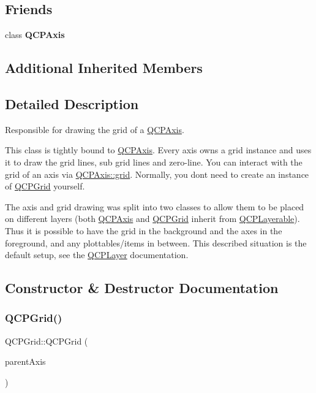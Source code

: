 \subsection*{Friends}
\begin{DoxyCompactItemize}
\item 
\hypertarget{class_q_c_p_grid_af123edeca169ec7a31958a1d714e1a8a}{}\label{class_q_c_p_grid_af123edeca169ec7a31958a1d714e1a8a} 
class {\bfseries Q\+C\+P\+Axis}
\end{DoxyCompactItemize}
\subsection*{Additional Inherited Members}


\subsection{Detailed Description}
Responsible for drawing the grid of a \hyperlink{class_q_c_p_axis}{Q\+C\+P\+Axis}. 

This class is tightly bound to \hyperlink{class_q_c_p_axis}{Q\+C\+P\+Axis}. Every axis owns a grid instance and uses it to draw the grid lines, sub grid lines and zero-\/line. You can interact with the grid of an axis via \hyperlink{class_q_c_p_axis_a63f1dd2df663680d2a8d06c19592dd63}{Q\+C\+P\+Axis\+::grid}. Normally, you don\textquotesingle{}t need to create an instance of \hyperlink{class_q_c_p_grid}{Q\+C\+P\+Grid} yourself.

The axis and grid drawing was split into two classes to allow them to be placed on different layers (both \hyperlink{class_q_c_p_axis}{Q\+C\+P\+Axis} and \hyperlink{class_q_c_p_grid}{Q\+C\+P\+Grid} inherit from \hyperlink{class_q_c_p_layerable}{Q\+C\+P\+Layerable}). Thus it is possible to have the grid in the background and the axes in the foreground, and any plottables/items in between. This described situation is the default setup, see the \hyperlink{class_q_c_p_layer}{Q\+C\+P\+Layer} documentation. 

\subsection{Constructor \& Destructor Documentation}
\hypertarget{class_q_c_p_grid_acd1cdd2909625388a13048b698494a17}{}\label{class_q_c_p_grid_acd1cdd2909625388a13048b698494a17} 
\subsubsection{\texorpdfstring{Q\+C\+P\+Grid()}{QCPGrid()}}
{\footnotesize\ttfamily Q\+C\+P\+Grid\+::\+Q\+C\+P\+Grid (\begin{DoxyParamCaption}\item[{\hyperlink{class_q_c_p_axis}{Q\+C\+P\+Axis} $\ast$}]{parent\+Axis }\end{DoxyParamCaption})}

